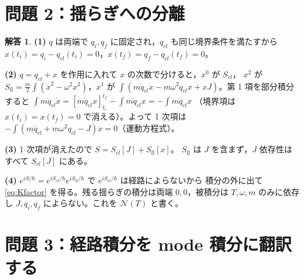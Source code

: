 \documentclass[dvipdfmx, uplatex]{jsarticle}
\theoremstyle{definition}
\newtheorem*{sol}{解答}
\begin{document}
\section{問題 2：揺らぎへの分離}

\begin{sol}
\textbf{(1)} $q$ は両端で $q_i,q_f$ に固定され，$q_{cl}$ も同じ境界条件を満たすから
$x(t_i)=q_i-q_{cl}(t_i)=0$，$x(t_f)=q_f-q_{cl}(t_f)=0$。

\par\smallskip
\textbf{(2)} $q=q_{cl}+x$ を作用に入れて $x$ の次数で分けると，$x^0$ が $S_{cl}$，
$x^2$ が $S_{\text{fl}}=\frac{m}{2}\int(\dot x^2-\omega^2x^2)$，$x^1$ が
$\int(m\dot q_{cl}\dot x-m\omega^2 q_{cl}x+xJ)$。第 1 項を部分積分すると
$\int m\dot q_{cl}\dot x=[m\dot q_{cl}x]_{t_i}^{t_f}-\int m\ddot q_{cl}x=-\int m\ddot q_{cl}x$
（境界項は $x(t_i)=x(t_f)=0$ で消える）。よって 1 次項は
$-\int(m\ddot q_{cl}+m\omega^2 q_{cl}-J)x=0$（運動方程式）。

\par\smallskip
\textbf{(3)} 1 次項が消えたので $S=S_{cl}[J]+S_{\text{fl}}[x]$。
$S_{\text{fl}}$ は $J$ を含まず，$J$ 依存性はすべて $S_{cl}[J]$ にある。

\par\smallskip
\textbf{(4)} $e^{iS/\hbar}=e^{iS_{cl}/\hbar}e^{iS_{\text{fl}}/\hbar}$ で $e^{iS_{cl}/\hbar}$ は経路によらないから
積分の外に出て \eqref{eq:Kfactor} を得る。残る揺らぎの積分は両端 $0,0$，被積分は $T,\omega,m$ のみに依存し
$J,q_i,q_f$ によらない。これを $\mathcal{N}(T)$ と書く。
\end{sol}

\section{問題 3：経路積分を mode 積分に翻訳する}
\end{document}
